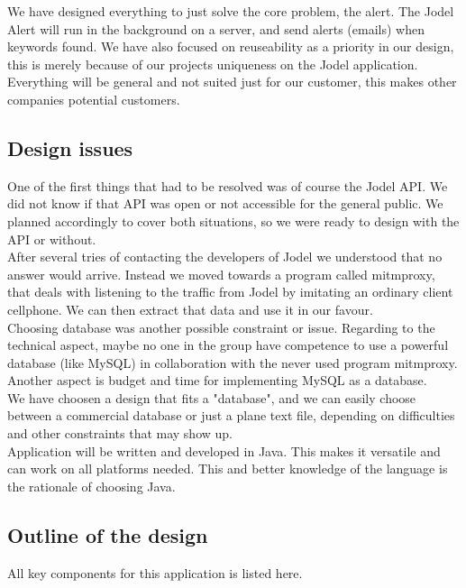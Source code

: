 \documentclass[a4paper,12pt]{article}
\begin{document}
We have designed everything to just solve the core problem, the alert. The Jodel Alert will run in the background on a server, and send alerts (emails) when keywords found. We have also focused on reuseability as a priority in our design, this is merely because of our projects uniqueness on the Jodel application. Everything will be general and not suited just for our customer, this makes other companies potential customers.


\subsection{Design issues}
One of the first things that had to be resolved was of course the Jodel API. We did not know if that API was open or not accessible for the general public. We planned accordingly to cover both situations, so we were ready to design with the API or without. \\

After several tries of contacting the developers of Jodel we understood that no answer would arrive. Instead we moved towards a program called mitmproxy, that deals with listening to the traffic from Jodel by imitating an ordinary client cellphone. We can then extract that data and use it in our favour.\\
Choosing database was another possible constraint or issue. Regarding to the technical aspect, maybe no one in the group have competence to use a powerful database (like MySQL) in collaboration with the never used program mitmproxy. Another aspect is budget and time for implementing MySQL as a database.  \\

We have choosen a design that fits a "database", and we can easily choose between a commercial database or just a plane text file, depending on difficulties and other constraints that may show up.\\

Application will be written and developed in Java. This makes it versatile and can work
on all platforms needed. This and better knowledge of the language is the rationale of choosing Java.
\subsection{Outline of the design}
All key components for this application is listed here.\\
\end{document}
